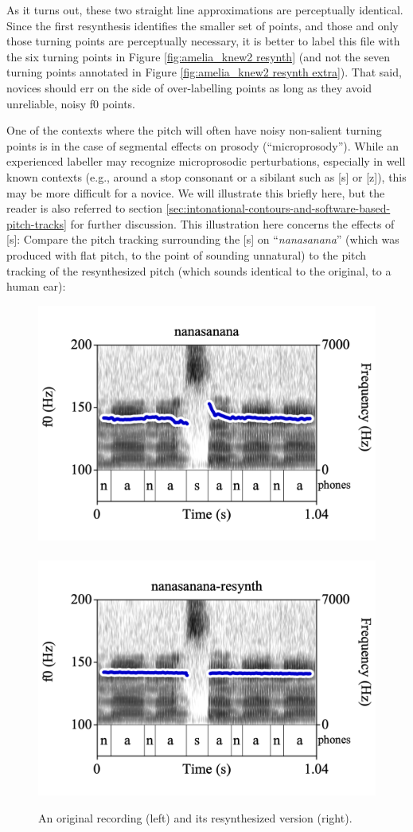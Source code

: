 \documentclass[11pt, twoside]{memoir}
\def\langtext#1{\textit{#1}}
\begin{document}
As it turns out, these two straight line approximations are perceptually identical. Since the first resynthesis identifies the smaller set of points, and those and only those turning points are perceptually necessary, it is better to label this file with the six turning points in Figure \ref{fig:amelia_knew2 resynth} (and not the seven turning points annotated in Figure \ref{fig:amelia_knew2 resynth extra}). That said, novices should err on the side of over-labelling points as long as they avoid unreliable, noisy f0 points.

One of the contexts where the pitch will often have noisy non-salient turning points is in the case of segmental effects on prosody (“microprosody”). While an experienced labeller may recognize microprosodic perturbations, especially in well known contexts (e.g., around a stop consonant or a sibilant such as [s] or [z]), this may be more difficult for a novice. We will illustrate this briefly here, but the reader is also referred to section \ref{sec:intonational-contours-and-software-based-pitch-tracks} for further discussion. This illustration here concerns the effects of [s]: Compare the pitch tracking surrounding the [s] on “\langtext{nanasanana}” (which was produced with flat pitch, to the point of sounding unnatural) to the pitch tracking of the resynthesized pitch (which sounds identical to the original, to a human ear):

\begin{figure}[H]
\centering
%
\includegraphics[width=.485\linewidth]{Points-nanasanana.png}~~\includegraphics[width=.485\linewidth]{Points-nanasanana-resynth.png}
%
\caption{An original recording (left) and its resynthesized version (right).%
\label{fig:original and resynth}%
}
\end{figure}
\end{document}
